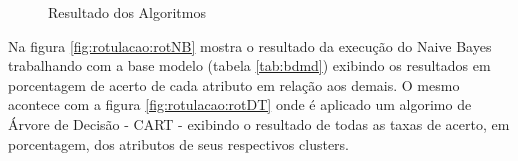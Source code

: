  \begin{figure}[h!]
    \centering
    \quad
    
    \caption{Resultado dos Algoritmos} \label{fig:rotulacao}
\end{figure}

Na figura \ref{fig:rotulacao:rotNB} mostra o resultado da execução do Naive Bayes trabalhando com a base modelo (tabela \ref{tab:bdmd}) exibindo os resultados em porcentagem de acerto de cada atributo em relação aos demais. O mesmo acontece com a figura \ref{fig:rotulacao:rotDT} onde é aplicado um algorimo de Árvore de Decisão - CART - exibindo o resultado de todas as taxas de acerto, em porcentagem, dos atributos de seus respectivos clusters.

